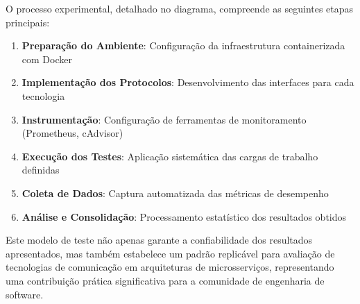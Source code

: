 O processo experimental, detalhado no diagrama, compreende as seguintes etapas principais:

\begin{enumerate}
\item \textbf{Preparação do Ambiente}: Configuração da infraestrutura containerizada com Docker
\item \textbf{Implementação dos Protocolos}: Desenvolvimento das interfaces para cada tecnologia
\item \textbf{Instrumentação}: Configuração de ferramentas de monitoramento (Prometheus, cAdvisor)
\item \textbf{Execução dos Testes}: Aplicação sistemática das cargas de trabalho definidas
\item \textbf{Coleta de Dados}: Captura automatizada das métricas de desempenho
\item \textbf{Análise e Consolidação}: Processamento estatístico dos resultados obtidos
\end{enumerate}

Este modelo de teste não apenas garante a confiabilidade dos resultados apresentados, mas também estabelece um padrão replicável para avaliação de tecnologias de comunicação em arquiteturas de microsserviços, representando uma contribuição prática significativa para a comunidade de engenharia de software.



